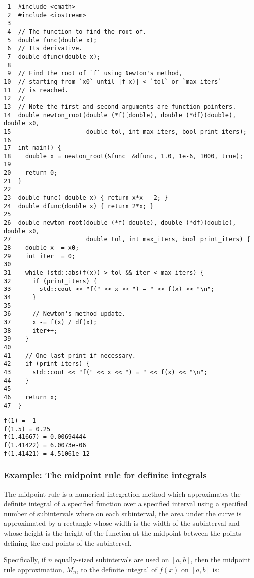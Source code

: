 \documentclass[11pt]{article}
\begin{document}
\begin{verbatim}
 1  #include <cmath>
 2  #include <iostream>
 3  
 4  // The function to find the root of.
 5  double func(double x);
 6  // Its derivative.
 7  double dfunc(double x);
 8  
 9  // Find the root of `f` using Newton's method,
10  // starting from `x0` until |f(x)| < `tol` or `max_iters`
11  // is reached.
12  //
13  // Note the first and second arguments are function pointers.
14  double newton_root(double (*f)(double), double (*df)(double), double x0,
15                     double tol, int max_iters, bool print_iters); 
16  
17  int main() {
18    double x = newton_root(&func, &dfunc, 1.0, 1e-6, 1000, true);
19  
20    return 0;
21  }
22  
23  double func( double x) { return x*x - 2; }
24  double dfunc(double x) { return 2*x; }
25  
26  double newton_root(double (*f)(double), double (*df)(double), double x0,
27                     double tol, int max_iters, bool print_iters) {
28    double x  = x0;
29    int iter  = 0;
30  
31    while (std::abs(f(x)) > tol && iter < max_iters) {
32      if (print_iters) { 
33        std::cout << "f(" << x << ") = " << f(x) << "\n";
34      }
35  
36      // Newton's method update.
37      x -= f(x) / df(x);
38      iter++;
39    }
40  
41    // One last print if necessary.
42    if (print_iters) { 
43      std::cout << "f(" << x << ") = " << f(x) << "\n";
44    }
45  
46    return x;
47  }
\end{verbatim}

\begin{verbatim}
f(1) = -1
f(1.5) = 0.25
f(1.41667) = 0.00694444
f(1.41422) = 6.0073e-06
f(1.41421) = 4.51061e-12
\end{verbatim}

\subsubsection{Example: The midpoint rule for definite integrals}
\label{sec:orgheadline47}

The midpoint rule is a numerical integration method which approximates 
the definite integral of a specified function over a specified interval 
using a specified number of subintervals where on each subinterval, the 
area under the curve is approximated by a rectangle whose width is the 
width of the subinterval and whose height is the height of the function 
at the midpoint between the points defining the end points of the subinterval.

Specifically, if \(n\) equally-sized subintervals are used on \([a,b]\), then
the midpoint rule approximation, \(M_n\), to the definite integral of \(f(x)\) 
on \([a,b]\) is: 
\end{document}

